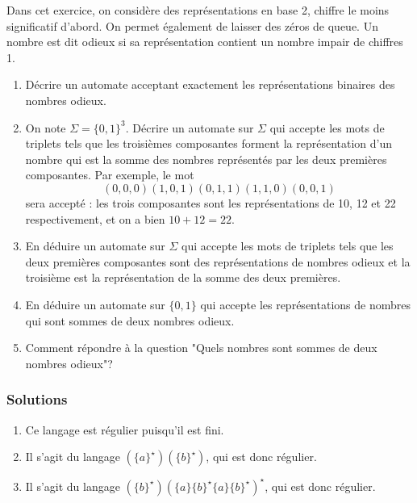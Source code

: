 \begin{exo}
Dans cet exercice, on considère des représentations en base 2, chiffre le moins significatif d'abord. On permet également de laisser des zéros de queue. Un nombre est dit odieux si sa représentation contient un nombre impair de chiffres 1.

\begin{enumerate}
\item Décrire un automate acceptant exactement les représentations binaires des nombres odieux.
\item On note $\Sigma=\{0,1\}^3$. Décrire un automate sur $\Sigma$ qui accepte les mots de triplets tels que les troisièmes composantes forment la représentation d'un nombre qui est la somme des nombres représentés par les deux premières composantes. Par exemple, le mot 
\[(0,0,0)(1,0,1)(0,1,1)(1,1,0)(0,0,1)\]
sera accepté : les trois composantes sont les représentations de 10, 12 et 22 respectivement, et on a bien $10+12=22$.
\item En déduire un automate sur $\Sigma$ qui accepte les mots de triplets tels que les deux premières composantes sont des représentations de nombres odieux et la troisième est la représentation de la somme des deux premières.
\item En déduire un automate sur $\{0,1\}$ qui accepte les représentations de nombres qui sont sommes de deux nombres odieux.
\item Comment répondre à la question "Quels nombres sont sommes de deux nombres odieux"?
\end{enumerate}
 
\end{exo}

\subsubsection{Solutions}

\begin{sol}
\begin{enumerate}
\item Ce langage est régulier puisqu'il est fini.
\item Il s'agit du langage $(\{a\}^\star)(\{b\}^\star)$, qui est donc régulier.
\item Il s'agit du langage $(\{b\}^\star)(\{a\}\{b\}^\star\{a\}\{b\}^\star)^\star$, qui est donc régulier.
\end{enumerate}
\end{sol}

